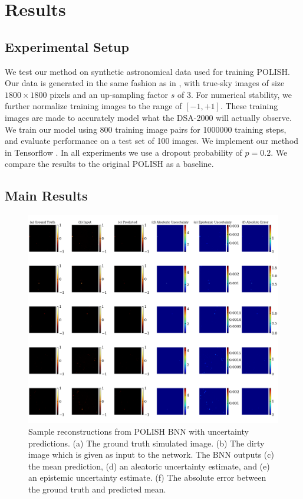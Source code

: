 \documentclass{article}
\begin{document}
\section{Results}


\subsection{Experimental Setup}

We test our method on synthetic astronomical data used for training POLISH. Our data is generated in the same fashion as in \citet{connor2021deep}, with true-sky images of size $1800\times1800$ pixels and an up-sampling factor $s$ of 3. For numerical stability, we further normalize training images to the range of $[-1, +1]$. These training images are made to accurately model what the DSA-2000 will actually observe. We train our model using 800 training image pairs for 1000000 training steps, and evaluate performance on a test set of 100 images. We implement our method in Tensorflow \cite{tensorflow2015-whitepaper}. In all experiments we use a dropout probability of $p=0.2$. We compare the results to the original POLISH as a baseline.


\subsection{Main Results}


\begin{figure}
    \centering
    \includegraphics[width=\linewidth]{img/reconstructions.png}
    \caption{Sample reconstructions from POLISH BNN with uncertainty predictions. (a) The ground truth simulated image. (b) The dirty image which is given as input to the network. The BNN outputs (c) the mean prediction, (d) an aleatoric uncertainty estimate, and (e) an epistemic uncertainty estimate. (f) The absolute error between the ground truth and predicted mean.}
    \label{fig:examples}
\end{figure}
\end{document}

